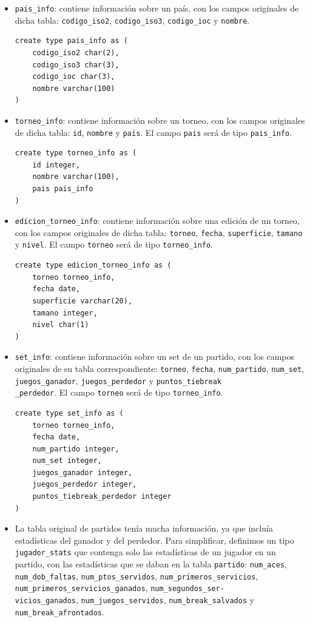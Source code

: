 \begin{itemize}
\item \texttt{pais\_info}: contiene información sobre un país, con los campos originales de dicha tabla: \texttt{codigo\_iso2}, \texttt{codigo\_iso3}, \texttt{codigo\_ioc} y \texttt{nombre}.
\begin{verbatim}
create type pais_info as (
	codigo_iso2 char(2),
	codigo_iso3 char(3),
	codigo_ioc char(3),
	nombre varchar(100)
)
\end{verbatim}
\item \texttt{torneo\_info}: contiene información sobre un torneo, con los campos originales de dicha tabla: \texttt{id}, \texttt{nombre} y \texttt{pais}. El campo \texttt{pais} será de tipo \texttt{pais\_info}.
\begin{verbatim}
create type torneo_info as (
	id integer,
	nombre varchar(100),
	pais pais_info
)
\end{verbatim}
\item \texttt{edicion\_torneo\_info}: contiene información sobre una edición de un torneo, con los campos originales de dicha tabla: \texttt{torneo}, \texttt{fecha}, \texttt{superficie}, \texttt{tamano} y \texttt{nivel}. El campo \texttt{torneo} será de tipo \texttt{torneo\_info}.
\begin{verbatim}
create type edicion_torneo_info as (
	torneo torneo_info,
	fecha date,
	superficie varchar(20),
	tamano integer,
	nivel char(1)
)
\end{verbatim}
\item \texttt{set\_info}: contiene información sobre un set de un partido, con los campos originales de su tabla correspondiente: \texttt{torneo}, \texttt{fecha}, \texttt{num\_partido}, \texttt{num\_set}, \texttt{juegos\_ganador}, \texttt{juegos\_perdedor} y \texttt{puntos\_tiebreak}\\\texttt{\_perdedor}. El campo \texttt{torneo} será de tipo \texttt{torneo\_info}.
\begin{verbatim}
create type set_info as (
	torneo torneo_info,
	fecha date, 
	num_partido integer,
    num_set integer,
	juegos_ganador integer,
	juegos_perdedor integer,
	puntos_tiebreak_perdedor integer
)
\end{verbatim}
\item La tabla original de partidos tenía mucha información, ya que incluía estadísticas del ganador y del perdedor. Para simplificar, definimos un tipo \texttt{jugador\_stats} que contenga solo las estadísticas de un jugador en un partido, con las estadísticas que se daban en la tabla \texttt{partido}: \texttt{num\_aces}, \texttt{num\_dob\_faltas}, \texttt{num\_ptos\_servidos}, \texttt{num\_primeros\_servicios}, \texttt{num\_primeros\_servicios\_ganados}, \texttt{num\_segundos\_ser-}\\\texttt{vicios\_ganados}, \texttt{num\_juegos\_servidos}, \texttt{num\_break\_salvados} y \texttt{num\_break\_afrontados}.

\end{itemize}
